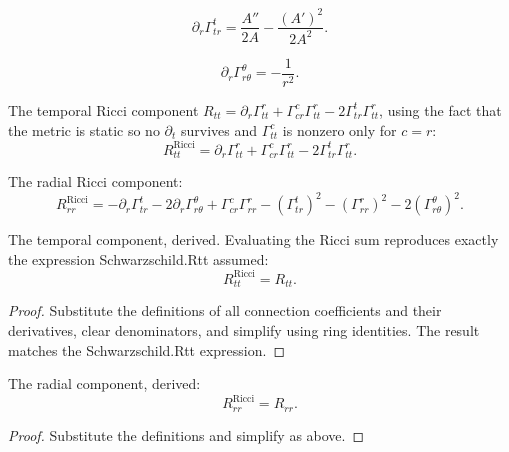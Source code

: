 \begin{definition}
$$\partial_r \Gamma^t_{tr} = \frac{A''}{2A} - \frac{(A')^2}{2A^2}.$$
\end{definition}

\begin{definition}
$$\partial_r \Gamma^\theta_{r\theta} = -\frac{1}{r^2}.$$
\end{definition}

\begin{definition}
The temporal Ricci component $R_{tt} = \partial_r \Gamma^r_{tt} + \Gamma^c_{cr}\Gamma^r_{tt} - 2\Gamma^t_{tr}\Gamma^r_{tt}$, using the fact that the metric is static so no $\partial_t$ survives and $\Gamma^c_{tt}$ is nonzero only for $c = r$:
$$R^{\text{Ricci}}_{tt} = \partial_r \Gamma^r_{tt} + \Gamma^c_{cr}\Gamma^r_{tt} - 2\Gamma^t_{tr}\Gamma^r_{tt}.$$
\end{definition}

\begin{definition}
The radial Ricci component:
$$R^{\text{Ricci}}_{rr} = -\partial_r \Gamma^t_{tr} - 2\partial_r \Gamma^\theta_{r\theta} + \Gamma^c_{cr}\Gamma^r_{rr} - (\Gamma^t_{tr})^2 - (\Gamma^r_{rr})^2 - 2(\Gamma^\theta_{r\theta})^2.$$
\end{definition}

\begin{theorem}
The temporal component, derived. Evaluating the Ricci sum reproduces exactly the expression Schwarzschild.Rtt assumed:
$$R^{\text{Ricci}}_{tt} = R_{tt}.$$
\end{theorem}

\begin{proof}
Substitute the definitions of all connection coefficients and their derivatives, clear denominators, and simplify using ring identities. The result matches the Schwarzschild.Rtt expression.
\end{proof}

\begin{theorem}
The radial component, derived:
$$R^{\text{Ricci}}_{rr} = R_{rr}.$$
\end{theorem}

\begin{proof}
Substitute the definitions and simplify as above.
\end{proof}

